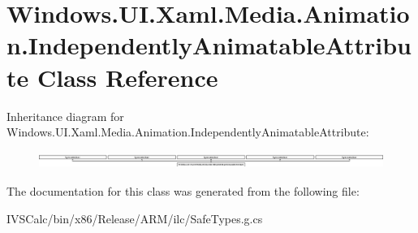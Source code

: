 \hypertarget{class_windows_1_1_u_i_1_1_xaml_1_1_media_1_1_animation_1_1_independently_animatable_attribute}{}\section{Windows.\+U\+I.\+Xaml.\+Media.\+Animation.\+Independently\+Animatable\+Attribute Class Reference}
\label{class_windows_1_1_u_i_1_1_xaml_1_1_media_1_1_animation_1_1_independently_animatable_attribute}
Inheritance diagram for Windows.\+U\+I.\+Xaml.\+Media.\+Animation.\+Independently\+Animatable\+Attribute\+:\begin{figure}[H]
\begin{center}
\leavevmode
\includegraphics[height=0.550369cm]{class_windows_1_1_u_i_1_1_xaml_1_1_media_1_1_animation_1_1_independently_animatable_attribute}
\end{center}
\end{figure}


The documentation for this class was generated from the following file\+:\begin{DoxyCompactItemize}
\item 
I\+V\+S\+Calc/bin/x86/\+Release/\+A\+R\+M/ilc/Safe\+Types.\+g.\+cs\end{DoxyCompactItemize}
